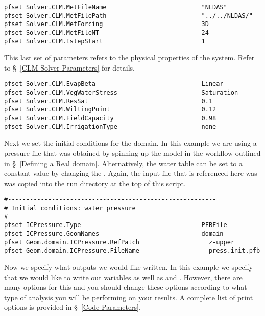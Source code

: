 \begin{verbatim}
pfset Solver.CLM.MetFileName                          "NLDAS"
pfset Solver.CLM.MetFilePath                          "../../NLDAS/"
pfset Solver.CLM.MetForcing                           3D
pfset Solver.CLM.MetFileNT                            24
pfset Solver.CLM.IstepStart                           1
\end{verbatim}

This last set of  parameters refers to the physical properties of the system. Refer to \S~\ref{CLM Solver Parameters}
for details. 
\begin{verbatim}
pfset Solver.CLM.EvapBeta                             Linear
pfset Solver.CLM.VegWaterStress                       Saturation
pfset Solver.CLM.ResSat                               0.1
pfset Solver.CLM.WiltingPoint                         0.12
pfset Solver.CLM.FieldCapacity                        0.98
pfset Solver.CLM.IrrigationType                       none
\end{verbatim}

Next we set the initial conditions for the domain. In this example we are using a pressure  
file that was obtained by spinning up the model in the workflow outlined in \S~\ref{Defining a Real domain}.
Alternatively, the water table can be set to a constant value by changing the . Again, 
the input file that is referenced here was was copied into the run directory at the top of this script. 

\begin{verbatim}
#---------------------------------------------------------
# Initial conditions: water pressure
#---------------------------------------------------------
pfset ICPressure.Type                                 PFBFile
pfset ICPressure.GeomNames                            domain
pfset Geom.domain.ICPressure.RefPatch                   z-upper
pfset Geom.domain.ICPressure.FileName                   press.init.pfb
\end{verbatim}

Now we specify what outputs we would like written. In this example we specify that we would like to write
out  variables as well as  and . However, there are many options 
for this and you should change these options according to what type of analysis you will be performing on your 
results. A complete list of print options is provided in \S~\ref{Code Parameters}. 

